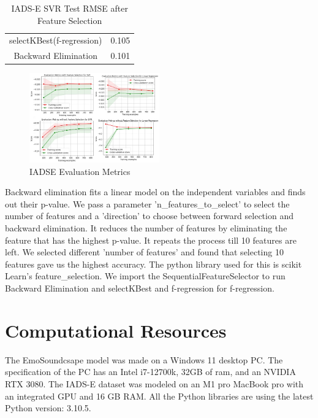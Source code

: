 \documentclass[conference]{IEEEtran}
\begin{document}
\begin{table}[h]
\caption{IADS-E SVR Test RMSE after Feature Selection}
\begin{center}
\begin{tabular}{ |c|c| } 
 \hline
 selectKBest(f-regression) & 0.105 \\
 Backward Elimination & 0.101 \\
 \hline
\end{tabular}

\end{center}
\label{tab:myTab}
\end{table}
\FloatBarrier
\begin{figure}[h]
\caption{IADSE Evaluation Metrics}
\centering
\includegraphics[width=0.5\textwidth]{Figures/combine_images.jpeg}
\end{figure}

\FloatBarrier

\noindent
Backward elimination fits a linear model on the independent variables and finds out their p-value. We pass a parameter 'n\_features\_to\_select' to select the number of features and a 'direction' to choose between forward selection and backward elimination. It reduces the number of features by eliminating the feature that has the highest p-value. It repeats the process till 10 features are left. We selected different 'number of features' and found that selecting 10 features gave us the highest accuracy. The python library used for this is scikit Learn's feature\_selection. We import the SequentialFeatureSelector to run Backward Elimination and selectKBest and f-regression for f-regression.\\
\section{Computational Resources}
\label{sec:models}

\noindent
The EmoSoundcsape model was made on a Windows 11 desktop PC. The specification of the PC has an Intel i7-12700k, 32GB of ram, and an NVIDIA RTX 3080. The IADS-E dataset was modeled on an M1 pro MacBook pro with an integrated GPU and 16 GB RAM. All the Python libraries are using the latest Python version: 3.10.5.\\
\end{document}
